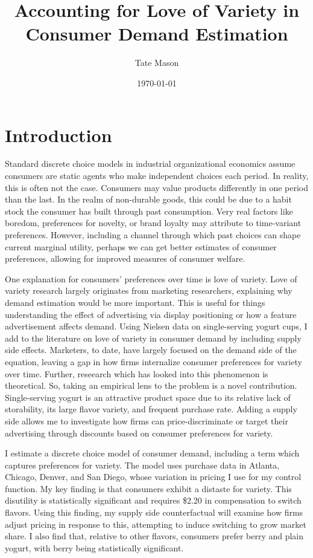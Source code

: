 \documentclass[11pt]{article}
\title{Accounting for Love of Variety in Consumer Demand Estimation}
\author{Tate Mason}
\date{\today}
\theoremstyle{definition}
\theoremstyle{remark}
\begin{document}
\maketitle
\thispagestyle{empty}
\newpage

\section{Introduction}

Standard discrete choice models in industrial organizational economics assume consumers are static agents who make independent choices each period. In reality, this is often not the case. Consumers may value products differently in one period than the last. In the realm of non-durable goods, this could be due to a habit stock the consumer has built through past consumption. Very real factors like boredom, preferences for novelty, or brand loyalty may attribute to time-variant preferences. However, including a channel through which past choices can shape current marginal utility, perhaps we can get better estimates of consumer preferences, allowing for improved measures of consumer welfare. 

One explanation for consumers' preferences over time is love of variety. Love of variety research largely originates from marketing researchers, explaining why demand estimation would be more important. This is useful for things understanding the effect of advertising via display positioning or how a feature advertisement affects demand. Using Nielsen data on single-serving yogurt cups, I add to the literature on love of variety in consumer demand by including supply side effects. Marketers, to date, have largely focused on the demand side of the equation, leaving a gap in how firms internalize consumer preferences for variety over time. Further, reseearch which has looked into this phenomenon is theoretical. So, taking an empirical lens to the problem is a novel contribution. Single-serving yogurt is an attractive product space due to its relative lack of storability, its large flavor variety, and frequent purchase rate. Adding a supply side allows me to investigate how firms can price-discriminate or target their advertising through discounts based on consumer preferences for variety. 

I estimate a discrete choice model of consumer demand, including a term which captures preferences for variety. The model uses purchase data in Atlanta, Chicago, Denver, and San Diego, whose variation in pricing I use for my control function. My key finding is that consumers exhibit a distaste for variety. This disutility is statistically significant and requires \$2.20 in compensation to switch flavors. Using this finding, my supply side counterfactual will examine how firms adjust pricing in response to this, attempting to induce switching to grow market share. I also find that, relative to other flavors, consumers prefer berry and plain yogurt, with berry being statistically significant.
\end{document}
